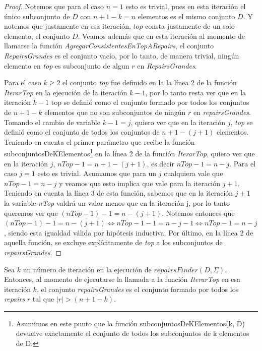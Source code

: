 \documentclass[11pt,a4paper,twoside]{tesis}
\begin{document}
\begin{proof}
Notemos que para el caso $n=1$ esto es trivial, pues en esta iteración el único subconjunto de $D$ con $n + 1 - k = n$ elementos es el mismo conjunto $D$. Y notemos que justamente en esa iteración, $top$ consta justamente de un solo elemento, el conjunto $D$. Veamos además que en esta iteración al momento de llamarse la función \textit{AgregarConsistentesEnTopARepairs}, el conjunto \textit{RepairsGrandes} es el conjunto vacío, por lo tanto, de manera trivial, ningún elemento en \textit{top} es subconjunto de algun $r$ en \textit{RepairsGrandes}.

Para el caso $k \geq 2$ el conjunto \textit{top} fue definido en la la línea 2 de la función \textit{IterarTop} en la ejecución de la iteración $k-1$, por lo tanto resta ver que en la iteración $k-1$ top se definió como el conjunto formado por todos los conjuntos de $n + 1 - k$ elementos que no son subconjuntos de ningún $r$ en \textit{repairsGrandes}. Tomando el cambio de variable $k - 1 = j$, quiero ver que en la iteración $j$, \textit{top} se definió como el conjunto de  todos los conjuntos de $n + 1 - (j + 1)$ elementos. Teniendo en cuenta el primer parámetro que recibe la función subconjuntosDeKElementos\footnote{Asumimos en este punto que la función subconjuntosDeKElementos(k, D) devuelve exactamente el conjunto de todos los subconjuntos de k elementos de D.} en la línea 2 de la función \textit{IterarTop}, quiero ver que en la iteración $j$, $nTop-1=n + 1 - (j + 1)$, es decir $nTop-1=n-j$. Para el caso $j=1$ esto es trivial. Asumamos que para un $j$ cualquiera vale que $nTop-1=n-j$ y veamos que esto implica que vale para la iteración $j+1$. Teniendo en cuenta la línea 3 de esta función, sabemos que en la iteración $j+1$ la variable \textit{nTop} valdrá un valor menos que en la iteración j, por lo tanto queremos ver que $(nTop-1) - 1 = n - (j+1)$. Notemos entonces que $(nTop-1) - 1 = n - (j+1) \iff nTop-1 - 1 = n - j -1 \iff nTop-1 = n - j$, siendo esta igualdad válida por hipótesis inductiva.
Por último, en la línea 2 de aquella función, se excluye explícitamente de \textit{top} a los subconjuntos de \textit{repairsGrandes}.
\end{proof}

\begin{lemma}\label{repairs_grandes_agregados}
Sea $k$ un número de iteración en la ejecución de $repairsFinder(D, \Sigma)$. Entonces, al momento de ejecutarse la llamada a la función \textit{IterarTop} en esa iteración $k$, el conjunto \textit{repairsGrandes} es el conjunto formado por todos los \textit{repairs} $r$ tal que $|r| > (n + 1 - k)$.
\end{lemma}
\end{document}
